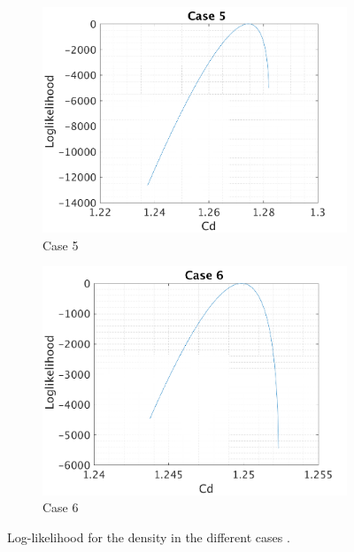 \documentclass{article}
\begin{document}
\begin{figure}[H]
\begin{center}
\begin{subfigure}{0.4\textwidth}
    \centering\includegraphics[width=1.1\textwidth,keepaspectratio]{images/inverse_problem/infer_drag/case5/cd_likelihood.png}
    \caption{\centering Case 5}
  \end{subfigure}
  \begin{subfigure}{0.4\textwidth}
    \centering\includegraphics[width=1.1\textwidth,keepaspectratio]{images/inverse_problem/infer_drag/case6/cd_likelihood.png}
    \caption{\centering Case 6}
  \end{subfigure}

\caption{Log-likelihood for the density in the different cases .}
\label{fig:cd_logl} 
 \end{center}
\end{figure}




%
\end{document}
